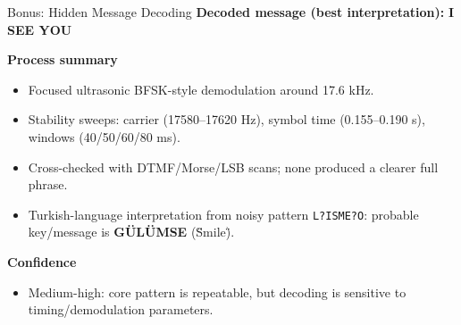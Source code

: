 \documentclass[aspectratio=169]{beamer}
\begin{document}
\begin{frame}{Bonus: Hidden Message Decoding}
\textbf{Decoded message (best interpretation):} \Large \textbf{I SEE YOU}

\vspace{2mm}
\normalsize
\textbf{Process summary}
\begin{itemize}
  \item Focused ultrasonic BFSK-style demodulation around 17.6 kHz.
  \item Stability sweeps: carrier (17580--17620 Hz), symbol time (0.155--0.190 s), windows (40/50/60/80 ms).
  \item Cross-checked with DTMF/Morse/LSB scans; none produced a clearer full phrase.
  \item Turkish-language interpretation from noisy pattern \texttt{L?ISME?O}: probable key/message is \textbf{G\"UL\"UMSE} (\"Smile\").
\end{itemize}

\textbf{Confidence}
\begin{itemize}
  \item Medium-high: core pattern is repeatable, but decoding is sensitive to timing/demodulation parameters.
\end{itemize}
\end{frame}
\end{document}
